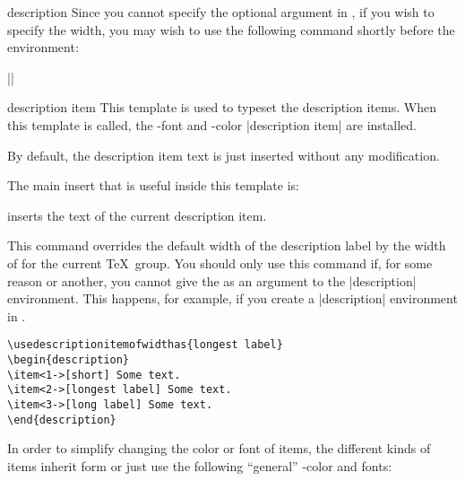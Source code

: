 \begin{environment}{{description}}
  \lyxnote
  Since you cannot specify the optional argument in \LyX, if you wish
  to specify the width, you may wish to use the following command
  shortly before the environment:

  ||
  
  \begin{element}{description item}\yes\yes\yes
    This template is used to typeset the description items. When this
    template is called, the \beamer-font and -color |description item|
    are installed.
    
    \begin{templateoptions}
      By default, the description item text is just inserted without
      any modification.
    \end{templateoptions}

    The main insert that is useful inside this template is:
    \begin{templateinserts}
      \iteminsert{\insertdescriptionitem} inserts the text of the
      current description item.
    \end{templateinserts}
  \end{element}
\end{environment}


\begin{command}{\beamersetusedescriptionitemofwidthas{}}
  This command overrides the default width of the
  description label by the width of  for the current
  \TeX\ group. You should only use this command if, for some reason or
  another, you cannot give the  as an argument to the
  |description| environment. This happens, for example, if you create a
  |description| environment in \LyX.

  \example
\begin{verbatim}
\usedescriptionitemofwidthas{longest label}
\begin{description}
\item<1->[short] Some text.
\item<2->[longest label] Some text.
\item<3->[long label] Some text.
\end{description}
\end{verbatim}
\end{command}



In order to simplify changing the color or font of items, the
different kinds of items inherit form or just use the following
``general'' \beamer-color and fonts:

